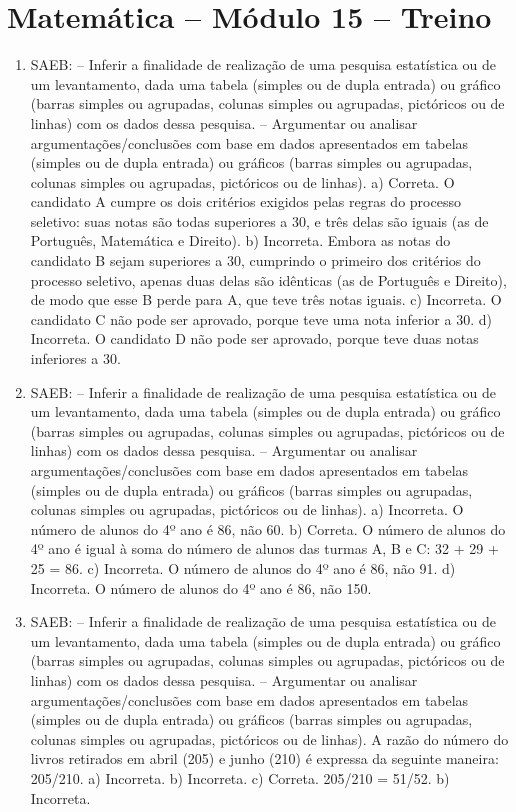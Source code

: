 \section*{Matemática -- Módulo 15 -- Treino}

\begin{enumerate}
\item
SAEB:
– Inferir a finalidade de realização de uma pesquisa estatística ou de
um levantamento, dada uma tabela (simples ou de dupla entrada) ou
gráfico (barras simples ou agrupadas, colunas simples ou agrupadas,
pictóricos ou de linhas) com os dados dessa pesquisa.
– Argumentar ou analisar argumentações/conclusões com base em dados
apresentados em tabelas (simples ou de dupla entrada) ou gráficos
(barras simples ou agrupadas, colunas simples ou agrupadas, pictóricos
ou de linhas).
a) Correta. O candidato A cumpre os dois critérios exigidos pelas
regras do processo seletivo: suas notas são todas superiores a 30, e três
delas são iguais (as de Português, Matemática e Direito).
b) Incorreta. Embora as notas do candidato B sejam superiores a 30, 
cumprindo o primeiro dos critérios do processo seletivo, apenas duas 
delas são idênticas (as de Português e Direito), de modo que esse 
B perde para A, que teve três notas iguais. 
c) Incorreta. O candidato C não pode ser aprovado, porque teve uma nota
inferior a 30.
d) Incorreta. O candidato D não pode ser aprovado, porque teve duas notas
inferiores a 30.

\item
SAEB:
– Inferir a finalidade de realização de uma pesquisa estatística ou de
um levantamento, dada uma tabela (simples ou de dupla entrada) ou
gráfico (barras simples ou agrupadas, colunas simples ou agrupadas,
pictóricos ou de linhas) com os dados dessa pesquisa.
– Argumentar ou analisar argumentações/conclusões com base em dados
apresentados em tabelas (simples ou de dupla entrada) ou gráficos
(barras simples ou agrupadas, colunas simples ou agrupadas, pictóricos
ou de linhas).
a) Incorreta. O número de alunos do 4º ano é 86, não 60.
b) Correta. O número de alunos do 4º ano é igual à soma do número de
alunos das turmas A, B e C: 32 + 29 + 25 = 86.
c) Incorreta. O número de alunos do 4º ano é 86, não 91.
d) Incorreta. O número de alunos do 4º ano é 86, não 150.

\item
SAEB:
– Inferir a finalidade de realização de uma pesquisa estatística ou de
um levantamento, dada uma tabela (simples ou de dupla entrada) ou
gráfico (barras simples ou agrupadas, colunas simples ou agrupadas,
pictóricos ou de linhas) com os dados dessa pesquisa.
– Argumentar ou analisar argumentações/conclusões com base em dados
apresentados em tabelas (simples ou de dupla entrada) ou gráficos
(barras simples ou agrupadas, colunas simples ou agrupadas, pictóricos
ou de linhas).
A razão do número do livros retirados em abril (205) e junho 
(210) é expressa da seguinte maneira: 205/210.  
a) Incorreta. 
b) Incorreta.
c) Correta. 205/210 = 51/52.
b) Incorreta.
\end{enumerate}


